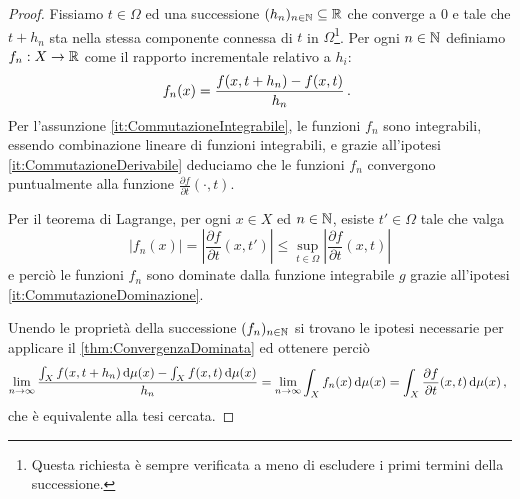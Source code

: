 \begin{proof}
	Fissiamo $t\in\Omega$ ed una successione $(h_n)_{n\in\mathbb N}\subseteq\mathbb R$ che converge a $0$ e tale che $t+h_n$ sta nella stessa componente connessa di $t$ in $\Omega$\footnote{Questa richiesta è sempre verificata a meno di escludere i primi termini della successione.}.
	Per ogni $n\in\mathbb N$ definiamo $f_n:X\to\mathbb R$ come il rapporto incrementale relativo a $h_i$:
	\begin{equation*}
		f_n(x)=\frac{f(x,t+h_n)-f(x,t)}{h_n} \, \text{. }
	\end{equation*}
	Per l'assunzione \ref{it:CommutazioneIntegrabile}, le funzioni $f_n$ sono integrabili, essendo combinazione lineare di funzioni integrabili, e grazie all'ipotesi \ref{it:CommutazioneDerivabile} deduciamo che le funzioni $f_n$ convergono puntualmente alla funzione $\frac{\partial f}{\partial t}({}\cdot,t)$.
	
	Per il teorema di Lagrange, per ogni $x\in X$ ed $n\in\mathbb N$, esiste $t'\in\Omega$ tale che valga
	\begin{equation*}
		\lvert f_n(x)\rvert=\left\lvert\frac{\partial f}{\partial t}(x,t')\right\rvert\le \sup_{t\in\Omega}\left\lvert \frac{\partial f}{\partial t}(x,t)\right\rvert
	\end{equation*}
	e perciò le funzioni $f_n$ sono dominate dalla funzione integrabile $g$ grazie all'ipotesi \ref{it:CommutazioneDominazione}.
	
	Unendo le proprietà della successione $(f_n)_{n\in\mathbb N}$ si trovano le ipotesi necessarie per applicare il \cref{thm:ConvergenzaDominata} ed ottenere perciò
	\begin{equation*}
		\lim_{n\to\infty} \frac{\int_X f(x,t+h_n)\,\mathrm d \mu(x)-\int_X f(x,t)\,\mathrm d\mu(x)}{h_n}=\lim_{n\to\infty} \int_X f_n(x)\,\mathrm d\mu(x)=\int_X \frac{\partial f}{\partial t}(x,t)\,\mathrm d\mu(x)\, \text{, }
	\end{equation*}
	che è equivalente alla tesi cercata.
\end{proof}






